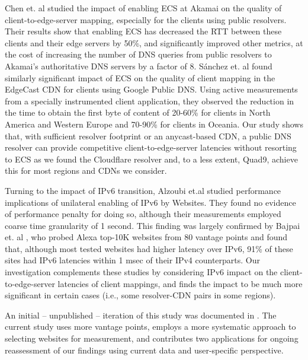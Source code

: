Chen et. al \cite{chen2015end} studied the impact of enabling ECS at Akamai on the quality of client-to-edge-server mapping, especially for the clients using public resolvers. Their results show that enabling ECS has decreased the RTT between these clients and their edge servers by 50\%, and significantly improved other metrics, at the cost of increasing the number of DNS queries from public resolvers to Akamai's authoritative DNS servers by a factor of 8. S\'anchez et. al \cite{sanchez2013dasu} found similarly significant impact of ECS on the quality of client mapping in the EdgeCast CDN for clients using Google Public DNS. Using active measurements from a specially instrumented client application, they observed the reduction in the time to obtain the first byte of content of 20-60\% for clients in North America and Western Europe and 70-90\% for clients in Oceania.   Our study shows that, with sufficient resolver footprint or an anycast-based CDN, a public DNS resolver can provide competitive client-to-edge-server latencies without resorting to ECS as we found the Cloudflare resolver and, to a less extent, Quad9, achieve this for most regions and CDNs we consider.  

Turning to the impact of IPv6 transition, Alzoubi et.al
\cite{alzoubi2013performance} studied performance implications of
unilateral enabling of IPv6 by Websites. They found no evidence of
performance penalty for doing so, although their measurements employed
coarse time granularity of 1 second. This finding was largely
confirmed by Bajpai et. al  \cite{bajpai2016measuring}, who probed
Alexa top-10K websites from 80 vantage points and 
found that, although most tested websites had higher latency over IPv6,
91\% of these sites had IPv6 latencies within 1 msec of their IPv4
counterparts. Our investigation complements these studies by
considering IPv6 impact on the client-to-edge-server latencies of 
client mappings, and finds the impact to be much more significant in certain
cases (i.e., some resolver-CDN pairs in some regions).

An initial -- unpublished -- iteration of this study was documented in
\cite{full_paper}.  The current study uses more vantage points, employs a
more systematic approach to selecting websites for measurement, and
contributes two applications for ongoing reassessment of our findings
using current data and user-specific perspective.
\vspace{-2mm}
